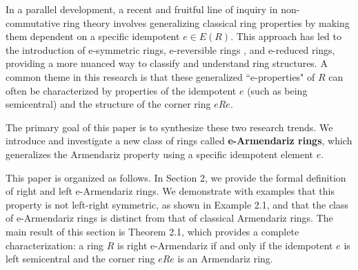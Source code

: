 \documentclass[12pt]{amsart}
\theoremstyle{plain}
\theoremstyle{definition}
\theoremstyle{remark}
\numberwithin{equation}{section}
\begin{document}
In a parallel development, a recent and fruitful line of inquiry in non-commutative ring theory involves generalizing classical ring properties by making them dependent on a specific idempotent $e \in E(R)$. This approach has led to the introduction of e-symmetric rings, e-reversible rings \cite{R4}, and e-reduced rings, providing a more nuanced way to classify and understand ring structures. A common theme in this research is that these generalized ``e-properties" of $R$ can often be characterized by properties of the idempotent $e$ (such as being semicentral) and the structure of the corner ring $eRe$.

The primary goal of this paper is to synthesize these two research trends. We introduce and investigate a new class of rings called \textbf{e-Armendariz rings}, which generalizes the Armendariz property using a specific idempotent element $e$.

This paper is organized as follows. In Section 2, we provide the formal definition of right and left e-Armendariz rings. We demonstrate with examples that this property is not left-right symmetric, as shown in Example 2.1, and that the class of e-Armendariz rings is distinct from that of classical Armendariz rings. The main result of this section is Theorem 2.1, which provides a complete characterization: a ring $R$ is right e-Armendariz if and only if the idempotent $e$ is left semicentral and the corner ring $eRe$ is an Armendariz ring.

\end{document}
